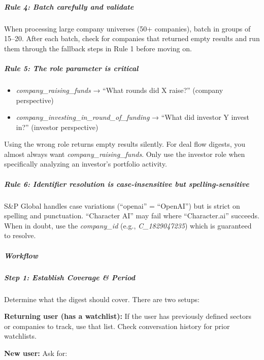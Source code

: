 \documentclass[11pt]{article}
\begin{document}
\subparagraph{Rule 4: Batch carefully and validate}\mbox{}\par

When processing large company universes (50+ companies), batch in groups of 15–20. After each batch, check for companies that returned empty results and run them through the fallback steps in Rule 1 before moving on.


\subparagraph{Rule 5: The \emph{role} parameter is critical}\mbox{}\par

\begin{itemize}[leftmargin=*,itemsep=2pt,topsep=2pt]
\item {} \emph{company\_\allowbreak{}raising\_\allowbreak{}funds} → ``What rounds did X raise?'' (company perspective)
\item {} \emph{company\_\allowbreak{}investing\_\allowbreak{}in\_\allowbreak{}round\_\allowbreak{}of\_\allowbreak{}funding} → ``What did investor Y invest in?'' (investor perspective)
\end{itemize}

Using the wrong role returns empty results silently. For deal flow digests, you almost always want \emph{company\_\allowbreak{}raising\_\allowbreak{}funds}. Only use the investor role when specifically analyzing an investor's portfolio activity.


\subparagraph{Rule 6: Identifier resolution is case-insensitive but spelling-sensitive}\mbox{}\par

S\&P Global handles case variations (``openai'' = ``OpenAI'') but is strict on spelling and punctuation. ``Character AI'' may fail where ``Character.ai'' succeeds. When in doubt, use the \emph{company\_\allowbreak{}id} (e.g., \emph{C\_\allowbreak{}1829047235}) which is guaranteed to resolve.


\subparagraph{Workflow}\mbox{}\par

\subparagraph{Step 1: Establish Coverage \& Period}\mbox{}\par

Determine what the digest should cover. There are two setups:


\textbf{Returning user (has a watchlist):} If the user has previously defined sectors or companies to track, use that list. Check conversation history for prior watchlists.


\textbf{New user:} Ask for:
\end{document}
